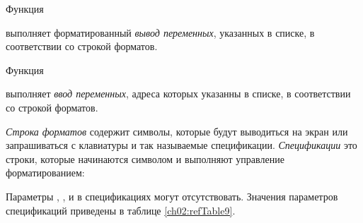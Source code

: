 Функция


выполняет форматированный \emph{вывод переменных}, указанных в списке, в
соответствии со строкой форматов. 

Функция


выполняет \emph{ввод переменных}, адреса которых указанны в списке, в
соответствии со строкой форматов. 

\emph{Строка форматов} содержит символы, которые будут выводиться на экран или запрашиваться с клавиатуры и
так называемые спецификации. \emph{Спецификации} это строки, которые начинаются символом
\Sys{\%} и выполняют управление форматированием:


Параметры , ,  и
 в спецификациях могут отсутствовать. Значения параметров спецификаций приведены в
таблице \ref{ch02:refTable9}.


